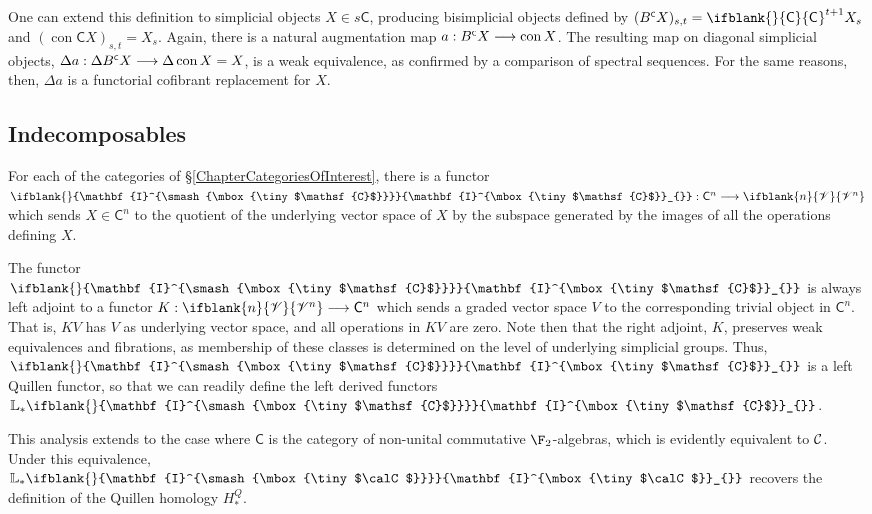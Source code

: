 \documentclass[10pt]{article}
\newcommand{\GR}[1]{\ifblank{#1}{\scrV}{\scrV^{#1}}}
\newcommand{\Ind}[2][]{\ifblank{#1}{\mathbf{I}^{\smash{\mbox{\tiny $#2$}}}}{\mathbf{I}^{\mbox{\tiny $#2$}}_{#1}}}%
\newcommand{\BarConst}[1]{B^{\smash{\mbox{\tiny $#1$}}}}
\newcommand{\Fr}[2][]{\ifblank{#1}{#2}{#2_{#1}}}
\DeclareMathOperator{\Constant}{con}
\newcommand{\derived}{\mathbb{L}}
\newcommand{\Comm}{\calC}
\begin{document}
\begin{HomotopicalAlgebra}
One can extend this definition to simplicial objects $X\in s\mathsf{C}$, producing bisimplicial objects defined by
$(\BarConst{\mathsf{C}}X)_{s,t}=\Fr{\mathsf{C}}^{t+1}X_s$ and $(\Constant{\mathsf{C}}X)_{s,t}=X_s$. Again, there is a natural augmentation map $a:\BarConst{\mathsf{C}}X\to\Constant X$. The resulting map on diagonal simplicial objects, $\Delta a:\Delta\BarConst{\mathsf{C}}X\to\Delta \Constant X= X$, is a weak equivalence, as confirmed by a comparison of spectral sequences. For the same reasons, then, $\Delta a$ is a functorial cofibrant replacement for $X$.
\end{HomotopicalAlgebra}
\begin{DiagramOfFunctors}
\subsection{Indecomposables}
For each of the categories of \S\ref{ChapterCategoriesOfInterest}, there is a functor $\Ind{\mathsf{C}}:\mathsf{C}^n\to\GR{n}$ which sends $X\in\mathsf{C}^n$ to the quotient of the underlying vector space of $X$ by the subspace generated by the images of all the operations defining $X$.

The functor $\Ind{\mathsf{C}}$ is always left adjoint to a functor $K:\GR{n}\to\mathsf{C}^n$ which sends a graded vector space $V$ to the corresponding trivial object in $\mathsf{C}^n$. That is, $KV$ has $V$ as underlying vector space, and all operations in $KV$ are zero. Note then that the right adjoint, $K$, preserves weak equivalences and fibrations, as membership of these classes is determined on the level of underlying simplicial groups. Thus, $\Ind{\mathsf{C}}$ is a left Quillen functor, so that we can readily define the left derived functors $\derived_*\Ind{\mathsf{C}}$.


This analysis extends to the case where $\mathsf{C}$ is the category of non-unital commutative $\F_2$-algebras, which is evidently equivalent to $\Comm$. Under this equivalence, $\derived_*\Ind{\Comm}$ recovers the definition of the Quillen homology $H_*^Q$.











\end{DiagramOfFunctors}
\end{document}
